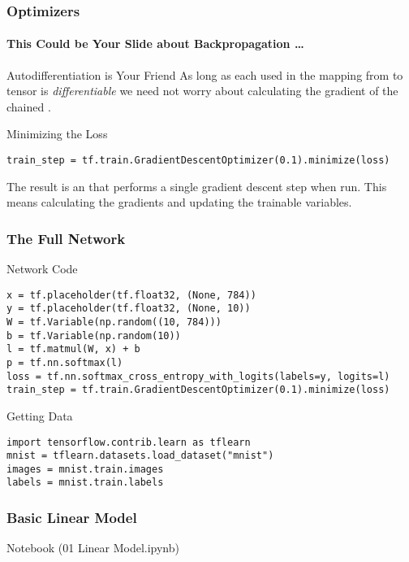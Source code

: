 \begin{frame}[fragile]
    \frametitle{Optimizers}
    \framesubtitle{This Could be Your Slide about Backpropagation \ldots}
    \begin{block}{Autodifferentiation is Your Friend}
        As long as each  used in the mapping from  to  tensor 
        is \emph{differentiable} we need not worry about calculating the gradient of the chained .
    \end{block}

    \begin{block}{Minimizing the Loss}
        \begin{lstlisting}
train_step = tf.train.GradientDescentOptimizer(0.1).minimize(loss)
        \end{lstlisting}
        The result is an  that performs a single gradient descent step when run. 
        This means calculating the gradients and updating the trainable variables.
    \end{block}
\end{frame}

\begin{frame}[fragile]
    \frametitle{The Full Network}
    \begin{block}{Network Code}
        \begin{lstlisting}
x = tf.placeholder(tf.float32, (None, 784))
y = tf.placeholder(tf.float32, (None, 10))
W = tf.Variable(np.random((10, 784)))
b = tf.Variable(np.random(10))
l = tf.matmul(W, x) + b
p = tf.nn.softmax(l)
loss = tf.nn.softmax_cross_entropy_with_logits(labels=y, logits=l)
train_step = tf.train.GradientDescentOptimizer(0.1).minimize(loss)
        \end{lstlisting}        
    \end{block}
\begin{block}{Getting Data}
        \begin{lstlisting}
import tensorflow.contrib.learn as tflearn
mnist = tflearn.datasets.load_dataset("mnist")
images = mnist.train.images
labels = mnist.train.labels
        \end{lstlisting}        
    \end{block}
\end{frame}

\begin{frame}[fragile]
    \frametitle{Basic Linear Model}
    \centering Notebook (01 Linear Model.ipynb)
\end{frame}
